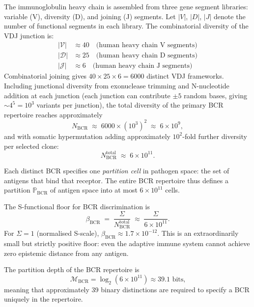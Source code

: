 \begin{example}
\label{ex:ch02-vdj-partition}
The immunoglobulin heavy chain is assembled from three gene segment libraries:
variable (V), diversity (D), and joining (J) segments.  Let $|V|$, $|D|$,
$|J|$ denote the number of functional segments in each library.  The
combinatorial diversity of the VDJ junction is:
\begin{align*}
  |\mathcal{V}| &\approx 40 \quad \text{(human heavy chain V segments)}\\
  |\mathcal{D}| &\approx 25 \quad \text{(human heavy chain D segments)}\\
  |\mathcal{J}| &\approx 6 \quad \text{(human heavy chain J segments)}
\end{align*}
Combinatorial joining gives $40 \times 25 \times 6 = 6000$ distinct VDJ
frameworks.  Including junctional diversity from exonuclease trimming and
N-nucleotide addition at each junction (each junction can contribute
$\pm 5$ random bases, giving $\sim 4^5 = 10^3$ variants per junction), the
total diversity of the primary BCR repertoire reaches approximately
\[
  N_{\mathrm{BCR}} \;\approx\; 6000 \times (10^3)^2 \;\approx\; 6 \times 10^9,
\]
and with somatic hypermutation adding approximately $10^2$-fold further
diversity per selected clone:
\[
  N_{\mathrm{BCR}}^{\mathrm{total}} \;\approx\; 6 \times 10^{11}.
\]

Each distinct BCR specifies one \emph{partition cell} in pathogen space: the
set of antigens that bind that receptor.  The entire BCR repertoire thus
defines a partition $\mathbb{P}_{\mathrm{BCR}}$ of antigen space into at most
$6 \times 10^{11}$ cells.

The S-functional floor for BCR discrimination is
\[
  \beta_{\mathrm{BCR}}
  \;=\; \frac{\Sigma}{N_{\mathrm{BCR}}^{\mathrm{total}}}
  \;\approx\; \frac{\Sigma}{6 \times 10^{11}}.
\]
For $\Sigma = 1$ (normalised S-scale), $\beta_{\mathrm{BCR}} \approx
1.7 \times 10^{-12}$.  This is an extraordinarily small but strictly positive
floor: even the adaptive immune system cannot achieve zero epistemic distance
from any antigen.

The partition depth of the BCR repertoire is
\[
  \mathcal{M}_{\mathrm{BCR}}
  = \log_2(6 \times 10^{11})
  \approx 39.1 \text{ bits,}
\]
meaning that approximately 39 binary distinctions are required to specify
a BCR uniquely in the repertoire.
\end{example}

